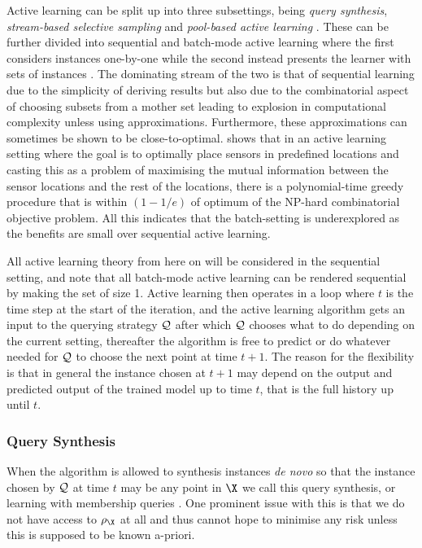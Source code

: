 Active learning can be split up into three subsettings, being \emph{query
synthesis}, \emph{stream-based selective sampling} and \emph{pool-based active
learning} \cite{settles12_activ_learn}. These can be further divided into
sequential and batch-mode active learning where the first considers instances
one-by-one while the second instead presents the learner with sets of instances
\cite{guo08_discr}. The dominating stream of the two is that of sequential
learning due to the simplicity of deriving results but also due to the
combinatorial aspect of choosing subsets from a mother set leading to explosion
in computational complexity unless using approximations. Furthermore, these
approximations can sometimes be shown to be close-to-optimal.
\cite{krause08_near_optim_sensor_placem_gauss_proces} shows that in an active
learning setting where the goal is to optimally place sensors in predefined
locations and casting this as a problem of maximising the mutual information
between the sensor locations and the rest of the locations, there is a
polynomial-time greedy procedure that is within \((1 - 1/e)\) of optimum of the
NP-hard combinatorial objective problem. All this indicates that the
batch-setting is underexplored as the benefits are small over sequential active
learning.

All active learning theory from here on will be considered in the sequential
setting, and note that all batch-mode active learning can be rendered sequential
by making the set of size 1. Active learning then operates in a loop where \(t\)
is the time step at the start of the iteration, and the active learning
algorithm gets an input to the querying strategy \(\mathcal{Q}\) after which
\(\mathcal{Q}\) chooses what to do depending on the current setting, thereafter
the algorithm is free to predict or do whatever needed for \(\mathcal{Q}\) to
choose the next point at time \(t+1\). The reason for the flexibility is that in
general the instance chosen at \(t+1\) may depend on the output and predicted
output of the trained model up to time \(t\), that is the full history up until \(t\).

\subsubsection{Query Synthesis} When the algorithm is allowed to synthesis
instances \emph{de novo} so that the instance chosen by \(\mathcal{Q}\) at time
\(t\) may be any point in \(\X\) we call this query synthesis, or learning with
membership queries \cite{angluin88_queries_concep_learn}. One prominent issue
with this is that we do not have access to \(\rho_{\X}\) at all and thus cannot
hope to minimise any risk unless this is supposed to be known a-priori.

